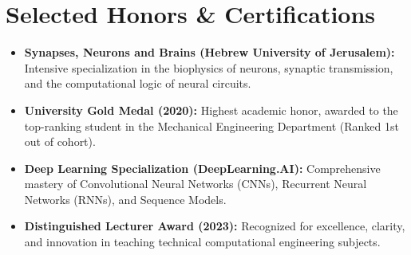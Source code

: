 \documentclass[10pt, letterpaper]{article}
\begin{document}
\section{Selected Honors \& Certifications}
\begin{itemize}
    \item \textbf{Synapses, Neurons and Brains (Hebrew University of Jerusalem):} Intensive specialization in the biophysics of neurons, synaptic transmission, and the computational logic of neural circuits.
    \item \textbf{University Gold Medal (2020):} Highest academic honor, awarded to the top-ranking student in the Mechanical Engineering Department (Ranked 1st out of cohort).
    \item \textbf{Deep Learning Specialization (DeepLearning.AI):} Comprehensive mastery of Convolutional Neural Networks (CNNs), Recurrent Neural Networks (RNNs), and Sequence Models.
    \item \textbf{Distinguished Lecturer Award (2023):} Recognized for excellence, clarity, and innovation in teaching technical computational engineering subjects.
\end{itemize}
\end{document}

